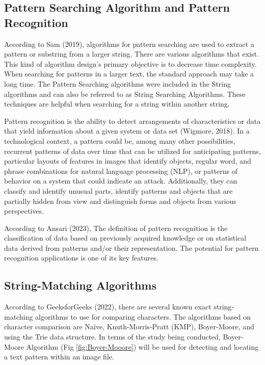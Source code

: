 \subsection*{Pattern Searching Algorithm and Pattern Recognition}
\hspace\parindent
According to Sam (2019), algorithms for pattern searching are used to extract a pattern or substring
from a larger string. There are various algorithms that exist. This kind of algorithm design's
primary objective is to decrease time complexity. When searching for patterns in a larger text, the
standard approach may take a long time. The Pattern Searching algorithms were included in the String
algorithms and can also be referred to as String Searching Algorithms. These techniques are helpful
when searching for a string within another string.

\hfill

Pattern recognition is the ability to detect arrangements of characteristics or data that yield
information about a given system or data set (Wigmore, 2018). In a technological context, a pattern
could be, among many other possibilities, recurrent patterns of data over time that can be utilized
for anticipating patterns, particular layouts of features in images that identify objects, regular
word, and phrase combinations for natural language processing (NLP), or patterns of behavior on a
system that could indicate an attack. Additionally, they can classify and identify unusual parts,
identify patterns and objects that are partially hidden from view and distinguish forms and objects
from various perspectives.

\hfill

According to Ansari (2023), The definition of pattern recognition is the classification of data
based on previously acquired knowledge or on statistical data derived from patterns and/or their
representation. The potential for pattern recognition applications is one of its key features.


\subsection*{String-Matching Algorithms}
\hspace\parindent
According to GeeksforGeeks (2022), there are several known exact string-matching algorithms to use
for comparing characters. The algorithms based on character comparison are Naïve, Knuth-Morris-Pratt
(KMP), Boyer-Moore, and using the Trie data structure. In terms of the study being conducted,
Boyer-Moore Algorithm (Fig \ref{fig:Boyer-Mooore}) will be used for detecting and locating a text
pattern within an image file.

